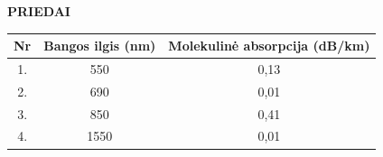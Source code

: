 {\hfill \bfseries {} PRIEDAI \hfill \vspace*{20pt}}



\begin{table}[H]
    \centering
      \begin{tabular}{|c|c|c|}
      \hline
      \textbf{Nr} & \textbf{Bangos ilgis (nm)} & \textbf{Molekulinė absorpcija (dB/km)} \bigstrut\\
      \hline
      1.    & 550   & 0,13 \bigstrut\\
      \hline
      2.    & 690   & 0,01 \bigstrut\\
      \hline
      3.    & 850   & 0,41 \bigstrut\\
      \hline
      4.    & 1550  & 0,01 \bigstrut\\
      \hline
      \end{tabular}%
    \label{tab:molecular-absorption-freq}%
\end{table}%



